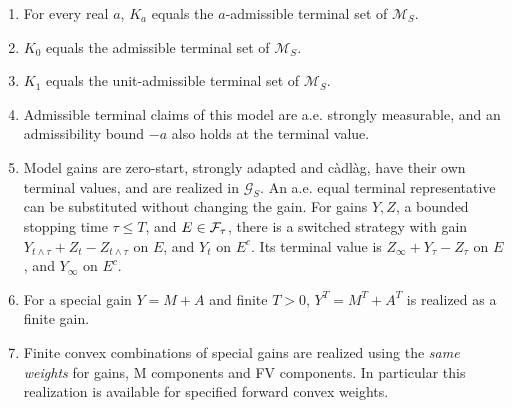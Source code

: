 \begin{proposition}\label{input:market}
\leavevmode\par
\begin{enumerate}
\item {}
For every real $a$, $K_a$ equals the $a$-admissible terminal set of $\mathcal M_S$.
\item {}
$K_0$ equals the admissible terminal set of $\mathcal M_S$.
\item {}
$K_1$ equals the unit-admissible terminal set of $\mathcal M_S$.
\item {}
Admissible terminal claims of this model are a.e. strongly measurable, and an admissibility bound $-a$ also holds at the terminal value.
\item {}
Model gains are zero-start, strongly adapted and c\`adl\`ag, have their own terminal values, and are realized in $\mathcal G_S$.
An a.e. equal terminal representative can be substituted without changing the gain.
For gains $Y,Z$, a bounded stopping time $\tau\leq T$, and $E\in\mathcal F_\tau$, there is a switched strategy
with gain $Y_{t\wedge\tau}+Z_t-Z_{t\wedge\tau}$ on $E$, and $Y_t$ on $E^c$.
Its terminal value is $Z_\infty+Y_\tau-Z_\tau$ on $E$, and $Y_\infty$ on $E^c$.
\item {}
For a special gain $Y=M+A$ and finite $T>0$, $Y^T=M^T+A^T$ is realized as a finite gain.
\item {}
Finite convex combinations of special gains are realized using the \emph{same weights} for gains, M components and FV components.
In particular this realization is available for specified forward convex weights.
\end{enumerate}
\end{proposition}

